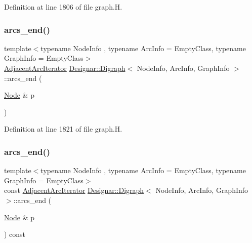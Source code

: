 Definition at line 1806 of file graph.\+H.

\mbox{\label{class_designar_1_1_digraph_ab7e47c93dd15bab0510977f403a35849}} 
\subsubsection{\texorpdfstring{arcs\+\_\+end()}{arcs\_end()}\hspace{0.1cm}{\footnotesize\ttfamily [3/4]}}
{\footnotesize\ttfamily template$<$typename Node\+Info , typename Arc\+Info  = Empty\+Class, typename Graph\+Info  = Empty\+Class$>$ \\
\hyperlink{class_designar_1_1_digraph_1_1_adjacent_arc_iterator}{Adjacent\+Arc\+Iterator} \hyperlink{class_designar_1_1_digraph}{Designar\+::\+Digraph}$<$ Node\+Info, Arc\+Info, Graph\+Info $>$\+::arcs\+\_\+end (\begin{DoxyParamCaption}\item[{\hyperlink{class_designar_1_1_digraph_a4dc921c41a480b7946a04170e997d8ae}{Node} \&}]{p }\end{DoxyParamCaption})\hspace{0.3cm}{\ttfamily [inline]}}



Definition at line 1821 of file graph.\+H.

\mbox{\label{class_designar_1_1_digraph_a68abe34d6f5a7b429715ec55aa030b7d}} 
\subsubsection{\texorpdfstring{arcs\+\_\+end()}{arcs\_end()}\hspace{0.1cm}{\footnotesize\ttfamily [4/4]}}
{\footnotesize\ttfamily template$<$typename Node\+Info , typename Arc\+Info  = Empty\+Class, typename Graph\+Info  = Empty\+Class$>$ \\
const \hyperlink{class_designar_1_1_digraph_1_1_adjacent_arc_iterator}{Adjacent\+Arc\+Iterator} \hyperlink{class_designar_1_1_digraph}{Designar\+::\+Digraph}$<$ Node\+Info, Arc\+Info, Graph\+Info $>$\+::arcs\+\_\+end (\begin{DoxyParamCaption}\item[{\hyperlink{class_designar_1_1_digraph_a4dc921c41a480b7946a04170e997d8ae}{Node} \&}]{p }\end{DoxyParamCaption}) const\hspace{0.3cm}{\ttfamily [inline]}}



